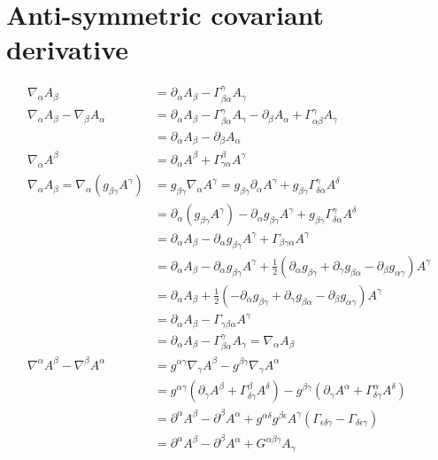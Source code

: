 \documentclass[11pt]{article}
\begin{document}
\section{Anti-symmetric covariant derivative}
\begin{equation}
\begin{aligned}
\nabla_\alpha A_\beta &= \partial_\alpha A_\beta - \Gamma^\gamma_{\beta\alpha} A_\gamma  \\
\nabla_\alpha A_\beta - \nabla_\beta A_\alpha &= \partial_\alpha A_\beta - \Gamma^\gamma_{\beta\alpha} A_\gamma -\partial_\beta A_\alpha + \Gamma^\gamma_{\alpha\beta} A_\gamma  \\
&= \partial_\alpha A_\beta -\partial_\beta A_\alpha  \\
\nabla_\alpha A^\beta &= \partial_\alpha A^\beta + \Gamma^\beta_{\gamma\alpha} A^\gamma  \\
\nabla_\alpha A_\beta = \nabla_\alpha ( g_{\beta\gamma} A^\gamma) &= g_{\beta\gamma} \nabla_\alpha A^\gamma = g_{\beta\gamma} \partial_\alpha A^\gamma + g_{\beta\gamma} \Gamma^\gamma_{\delta\alpha} A^\delta \\
&= \partial_\alpha (g_{\beta\gamma} A^\gamma) - \partial_\alpha g_{\beta\gamma} A^\gamma + g_{\beta\gamma} \Gamma^\gamma_{\delta\alpha} A^\delta \\
&= \partial_\alpha A_\beta - \partial_\alpha g_{\beta\gamma} A^\gamma +  \Gamma_{\beta\gamma\alpha} A^\gamma \\
&= \partial_\alpha A_\beta - \partial_\alpha g_{\beta\gamma} A^\gamma +  \frac{1}{2} (\partial_\alpha g_{\beta\gamma} + \partial_\gamma g_{\beta\alpha} - \partial_\beta g_{\alpha\gamma}) A^\gamma \\
&= \partial_\alpha A_\beta +  \frac{1}{2} ( - \partial_\alpha g_{\beta\gamma} + \partial_\gamma g_{\beta\alpha} - \partial_\beta g_{\alpha\gamma}) A^\gamma \\
&= \partial_\alpha A_\beta - \Gamma_{\gamma\beta\alpha} A^\gamma \\
&= \partial_\alpha A_\beta - \Gamma^\gamma_{\beta\alpha} A_\gamma = \nabla_\alpha A_\beta \\
\nabla^\alpha A^\beta - \nabla^\beta A^\alpha &= g^{\alpha\gamma} \nabla_\gamma A^\beta - g^{\beta\gamma} \nabla_\gamma A^\alpha \\
&= g^{\alpha\gamma} (\partial_\gamma A^\beta + \Gamma^\beta_{\delta\gamma} A^\delta) - g^{\beta\gamma} (\partial_\gamma A^\alpha + \Gamma^\alpha_{\delta\gamma} A^\delta) \\
&= \partial^\alpha A^\beta - \partial^\beta A^\alpha + g^{\alpha\delta} g^{\beta\epsilon} A^\gamma( \Gamma_{\epsilon\delta\gamma} - \Gamma_{\delta\epsilon\gamma}) \\
&= \partial^\alpha A^\beta - \partial^\beta A^\alpha + G^{\alpha\beta\gamma} A_\gamma \\
\end{aligned}
\end{equation}
\end{document}
